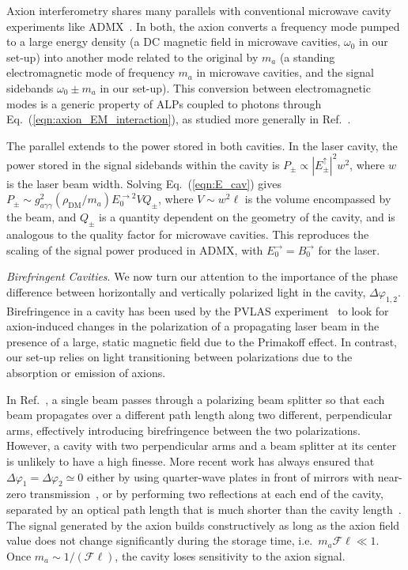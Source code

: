 \documentclass[aps,prd,nofootinbib,twocolumn,superscriptaddress,preprintnumbers,letterpaper, longbibliography]{revtex4-1}
\def\Epm{E_\pm^\uparrow}
\def\Ref{Ref.~}
\begin{document}
Axion interferometry shares many parallels with conventional microwave cavity experiments like ADMX~\cite{Du:2018uak}. In both, the axion converts a frequency mode pumped to a large energy density (a DC magnetic field in microwave cavities, $\omega_0$ in our set-up) into another mode related to the original by $m_a$ (a standing electromagnetic mode of frequency $m_a$ in microwave cavities, and the signal sidebands $\omega_0 \pm m_a$ in our set-up). This conversion between electromagnetic modes is a generic property of ALPs coupled to photons through Eq.~(\ref{eqn:axion_EM_interaction}), as studied more generally in \Ref\cite{Goryachev:2018vjt}. 

The parallel extends to the power stored in both cavities. In the laser cavity, the power stored in the signal sidebands within the cavity is $P_\pm \propto |\Epm|^2 w^2$, where $w$ is the laser beam width. Solving Eq.~(\ref{eqn:E_cav}) gives $P_\pm \sim g_{a\gamma\gamma}^2 (\rho_\text{DM}/m_a) E_0^{\rightarrow 2} V Q_\pm$, where $V \sim w^2 \ell$ is the volume encompassed by the beam, and $Q_\pm$ is a quantity dependent on the geometry of the cavity, and is analogous to the quality factor for microwave cavities. This reproduces the scaling of the signal power produced in ADMX, with $E_0^\rightarrow = B_0^\rightarrow$ for the laser. 

\vspace{0.2cm}
\textit{Birefringent Cavities}. We now turn our attention to the importance of the phase difference between horizontally and vertically polarized light in the cavity, $\Delta \varphi_{1,2}$. Birefringence in a cavity has been used by the PVLAS experiment~\cite{DellaValle:2015xxa} to look for axion-induced changes in the polarization of a propagating laser beam in the presence of a large, static magnetic field due to the Primakoff effect. In contrast, our set-up relies on light transitioning between polarizations due to the absorption or emission of axions. 

In Ref.~\cite{Melissinos:2008vn}, a single beam passes through a polarizing beam splitter so that each beam propagates over a different path length along two different, perpendicular arms, effectively introducing birefringence between the two polarizations. However, a cavity with two perpendicular arms and a beam splitter at its center is unlikely to have a high finesse. More recent work has always ensured that $\Delta \varphi_1 = \Delta \varphi_2 \simeq 0$ either by using quarter-wave plates in front of mirrors with near-zero transmission~\cite{DeRocco:2018jwe}, or by performing two reflections at each end of the cavity, separated by an optical path length that is much shorter than the cavity length~\cite{Obata:2018vvr}. The signal generated by the axion builds constructively as long as the axion field value does not change significantly during the storage time, i.e.\ $m_a \mathcal{F} \ell \ll 1$. Once $m_a \sim 1/(\mathcal{F} \ell)$, the cavity loses sensitivity to the axion signal. 
\end{document}
